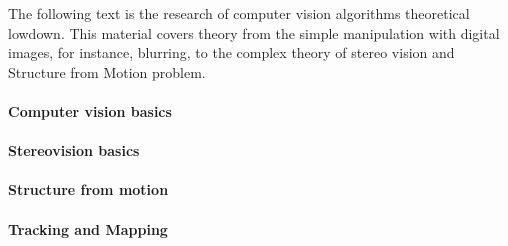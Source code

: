 \documentclass[../../../../main]{subfiles}
\begin{document}
The following text is the research of computer vision algorithms theoretical lowdown. This material covers theory from the simple manipulation with digital images, for instance, blurring, to the complex theory of stereo vision and Structure from Motion problem.

\paragraph{Computer vision basics}

\newpage

\paragraph{Stereovision basics}

\newpage

\paragraph{Structure from motion}

\newpage

\paragraph{Tracking and Mapping}

\newpage
\end{document}
